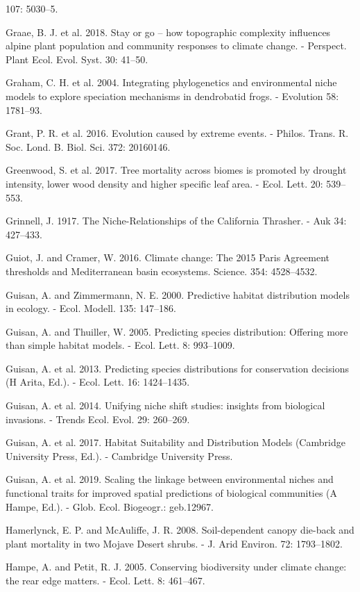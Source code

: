 \documentclass[11pt,twoside]{reedthesis}
\begin{document}
107: 5030--5.\par
Graae, B. J. et al. 2018. Stay or go -- how topographic complexity
influences alpine plant population and community responses to climate
change. - Perspect. Plant Ecol. Evol. Syst. 30: 41--50.\par
Graham, C. H. et al. 2004. Integrating phylogenetics and environmental
niche models to explore speciation mechanisms in dendrobatid frogs. -
Evolution 58: 1781--93.\par
Grant, P. R. et al. 2016. Evolution caused by extreme events. - Philos.
Trans. R. Soc. Lond. B. Biol. Sci. 372: 20160146.\par
Greenwood, S. et al. 2017. Tree mortality across biomes is promoted by
drought intensity, lower wood density and higher specific leaf area. -
Ecol. Lett. 20: 539--553.\par
Grinnell, J. 1917. The Niche-Relationships of the California Thrasher. -
Auk 34: 427--433.\par
Guiot, J. and Cramer, W. 2016. Climate change: The 2015 Paris Agreement
thresholds and Mediterranean basin ecosystems. Science. 354:
4528--4532.\par
Guisan, A. and Zimmermann, N. E. 2000. Predictive habitat distribution
models in ecology. - Ecol. Modell. 135: 147--186.\par
Guisan, A. and Thuiller, W. 2005. Predicting species distribution:
Offering more than simple habitat models. - Ecol. Lett. 8:
993--1009.\par
Guisan, A. et al. 2013. Predicting species distributions for
conservation decisions (H Arita, Ed.). - Ecol. Lett. 16: 1424--1435.\par
Guisan, A. et al. 2014. Unifying niche shift studies: insights from
biological invasions. - Trends Ecol. Evol. 29: 260--269.\par
Guisan, A. et al. 2017. Habitat Suitability and Distribution Models
(Cambridge University Press, Ed.). - Cambridge University Press.\par
Guisan, A. et al. 2019. Scaling the linkage between environmental niches
and functional traits for improved spatial predictions of biological
communities (A Hampe, Ed.). - Glob. Ecol. Biogeogr.: geb.12967.\par
Hamerlynck, E. P. and McAuliffe, J. R. 2008. Soil-dependent canopy
die-back and plant mortality in two Mojave Desert shrubs. - J. Arid
Environ. 72: 1793--1802.\par
Hampe, A. and Petit, R. J. 2005. Conserving biodiversity under climate
change: the rear edge matters. - Ecol. Lett. 8: 461--467.\par
\end{document}
